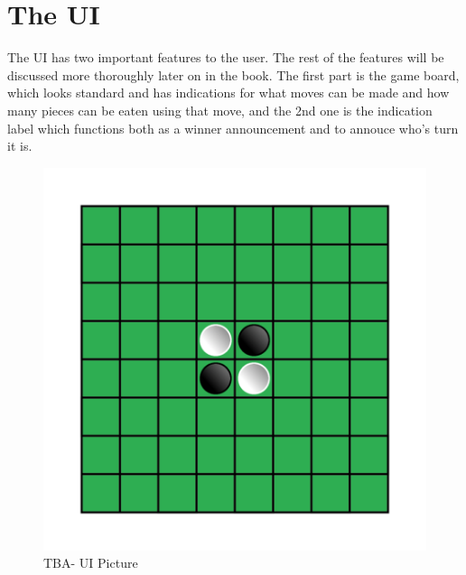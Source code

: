 \documentclass[12pt,a4paper, openany]{report}
\begin{document}
\section{The UI}
The UI has two important features to the user. The rest of the features will be discussed more thoroughly later on in the book. The first part is the game board, which looks standard and has indications for what moves can be made and how many pieces can be eaten using that move, and the 2nd one is the indication label which functions both as a winner announcement and to annouce who's turn it is.
\begin{figure}[ht]
\begin{center}
\includegraphics[scale=0.5]{reversi}
\caption{TBA- UI Picture}
\end{center}
\end{figure}
\end{document}
